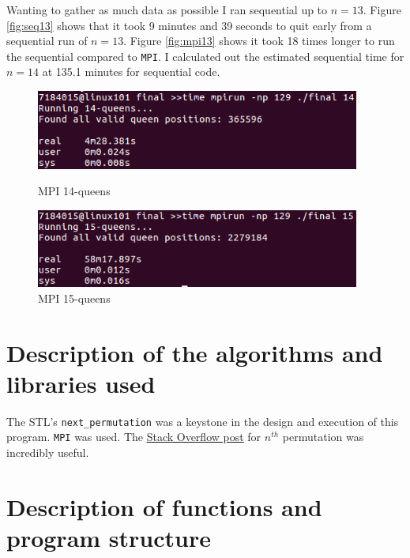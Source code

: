 \documentclass{article}
\begin{document}
Wanting to gather as much data as possible I ran sequential up to $n=13$. Figure 
\ref{fig:seq13} shows that it took 9 minutes and 39 seconds to quit early from a 
sequential run of $n=13$. Figure \ref{fig:mpi13} shows it took 18 times longer 
to run the sequential compared to \verb|MPI|. I calculated out the estimated 
sequential time for $n=14$ at 135.1 minutes for sequential code.

\begin{figure}[h]
    \centering
    \begin{minipage}{0.49\textwidth}
        \centering
        \includegraphics[width=0.95\textwidth]{images/MPI_14}
        \caption{MPI 14-queens}
        \label{fig:mpi14}
    \end{minipage}\hfill
    \begin{minipage}{0.49\textwidth}
        \centering
        \includegraphics[width=0.95\textwidth]{images/MPI_15}
        \caption{MPI 15-queens}
        \label{fig:mpi15}
    \end{minipage}
\end{figure}



\section{Description of the algorithms and libraries used}
The STL's \verb|next_permutation| was a keystone in the design and execution of 
this program. \verb|MPI| was used. The 
\href{https://stackoverflow.com/a/7919887}{Stack Overflow post} for $n^{th}$ 
permutation was incredibly useful.

\section{Description of functions and program structure}
\end{document}
